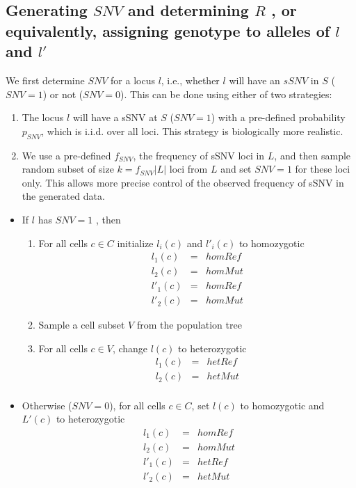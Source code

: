 \documentclass[a4paper,11pt]{article}
\begin{document}
\subsection{Generating $SNV$ and determining $R$ , or equivalently, assigning genotype to alleles of $l$ and $l'$}
\label{sec:generating-ssnv}


We first determine $SNV$ for a locus $l$, i.e., whether $l$ will have
an $sSNV$ in $S$ ($SNV=1$) or not ($SNV=0$). This can be done using
either of two strategies:
\begin{enumerate}
\item The locus $l$ will have a sSNV at $S$ ($SNV=1$) with a
  pre-defined probability $p_{SNV}$, which is i.i.d. over all
  loci. This strategy is biologically more realistic.
\item We use a pre-defined $f_{SNV}$, the frequency of sSNV loci in $L$, and then
  sample random subset of size $k=f_{SNV}|L|$ loci from $L$ and set
  $SNV=1$ for these loci only. This allows more precise control of the
  observed frequency of sSNV in the generated data.
\end{enumerate}

\begin{itemize}
\item If  $l$ has $SNV=1$
  , then
  \begin{enumerate}
  \item For all cells $c\in C$ initialize $l_i(c)$ and $l'_i(c) $ to homozygotic
    \begin{eqnarray*}
      l_1(c) &=& homRef \\
      l_2(c) &=& homMut \\
      l'_1(c) &=& homRef \\
      l'_2(c) &=& homMut 
    \end{eqnarray*}
  \item Sample a cell subset $V$ from the population tree
  \item For all cells $c\in V$, change $l(c)$ to heterozygotic
    \begin{eqnarray*}
      l_1(c) &=& hetRef \\
      l_2(c) &=& hetMut \\
    \end{eqnarray*}
  \end{enumerate}
\item Otherwise ($SNV=0$), for all cells $c\in C$, set $l(c)$ to homozygotic and $L'(c)$ to heterozygotic
  \begin{eqnarray*}
    l_1(c) &=& homRef \\
    l_2(c) &=& homMut \\
    l'_1(c) &=& hetRef \\
    l'_2(c) &=& hetMut 
  \end{eqnarray*}
\end{itemize}
\end{document}
